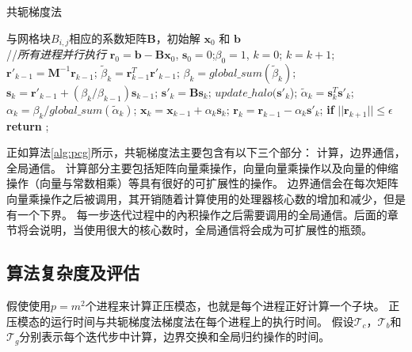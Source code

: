 \begin{algorithm}[h]
\caption{共轭梯度法}
\label{alg:pcg}
\begin{algorithmic}[1]
\REQUIRE  与网格块$B_{i,j}$相应的系数矩阵$\textbf{B}$，初始解 $\textbf{x}_0$ 和 $\textbf{b}$  \\
//\qquad    \textit{所有进程并行执行}
\STATE $\textbf{r}_0 = \textbf{b}-\textbf{B}\textbf{x}_0$, $\textbf{s}_0 =0$;\quad $\beta_0=1$, $k=0$;
\STATE $k=k+1$; 
\STATE $\textbf{r}'_{k-1} =\textbf{M}^{-1}\textbf{r}_{k-1}$;  \label{AlgPcgPrecond}
\STATE $\tilde{\beta}_k = \textbf{r}_{k-1}^T\textbf{r}'_{k-1}$; \label{AlgPcgInner1}
\STATE $\beta_k = global\_sum(\tilde{\beta}_k)$;  \label{AlgPcgGlobal1}
\STATE $\textbf{s}_k = \textbf{r}'_{k-1} +(\beta_k/\beta_{k-1})\textbf{s}_{k-1}$;\label{AlgPcgVec1}
\STATE $\textbf{s}'_k = \textbf{B}\textbf{s}_k$; \label{AlgPcgAx}
\STATE $update\_halo(\textbf{s}'_k$); \label{AlgPcgBound}
\STATE $\tilde{\alpha}_k = \textbf{s}_k^T\textbf{s}'_k$; \label{AlgPcgInner2}
\STATE $\alpha_k =\beta_k/ global\_sum(\tilde{\alpha}_k)$;\quad {}\label{AlgPcgGlobal2}
\STATE $\textbf{x}_k =\textbf{x}_{k-1} +\alpha_k \textbf{s}_k$;\label{AlgPcgVec2}
\STATE $\textbf{r}_k =\textbf{r}_{k-1} -\alpha_k\textbf{s}'_k$;\label{AlgPcgVec3}
\STATE \textbf{if} $||\textbf{r}_{k+1}|| \le \epsilon$  \textbf{return} ;
\ENDIF
\ENDWHILE
\end{algorithmic}
\end{algorithm}

 
正如算法\ref{alg:pcg}所示，共轭梯度法主要包含有以下三个部分： 计算，边界通信，全局通信。
计算部分主要包括矩阵向量乘操作，向量向量乘操作以及向量的伸缩操作（向量与常数相乘）等具有很好的可扩展性的操作。 
边界通信会在每次矩阵向量乘操作之后被调用，其开销随着计算使用的处理器核心数的增加和减少，但是有一个下界。 
每一步迭代过程中的內积操作之后需要调用的全局通信。后面的章节将会说明，当使用很大的核心数时，全局通信将会成为可扩展性的瓶颈。
 

\subsection{算法复杂度及评估}
\label{solver:pcgComplex}
假使使用$p=m^2$个进程来计算正压模态，也就是每个进程正好计算一个子块。 
正压模态的运行时间与共轭梯度法梯度法在每个进程上的执行时间。 
假设$\mathcal{T}_c$，$\mathcal{T}_b$和$\mathcal{T}_g$分别表示每个迭代步中计算，边界交换和全局归约操作的时间。


